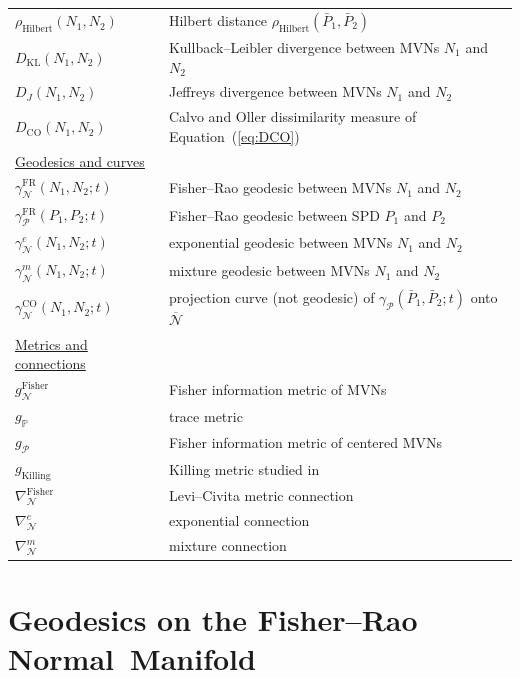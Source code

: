 \documentclass[entropy,article,accept,oneauthor,pdftex,entropy]{Definitions/mdpi}
\def\Hilbert{\mathrm{Hilbert}}
\def\bbP{\mathbb{P}}
\def\FR{\mathrm{FR}}
\def\barN{{\overline{\mathcal{N}}}}
\def\CO{\mathrm{CO}}
\def\KL{\mathrm{KL}}
\def\Killing{\mathrm{Killing}}
\def\Fisher{\mathrm{Fisher}}
\def\calN{\mathcal{N}}
\def\calP{\mathcal{P}}
\def\barP{{\bar P}}
\begin{document}
{\begin{tabular}{@{}p{4.1cm}l}
$\rho_\Hilbert(N_1,N_2)$ & Hilbert distance $\rho_\Hilbert(\barP_1,\barP_2)$\\
$D_\KL(N_1,N_2)$ & Kullback–Leibler divergence  between   MVNs $N_1$ and $N_2$\\
$D_J(N_1,N_2)$ & Jeffreys divergence  between   MVNs $N_1$ and $N_2$\\
$D_\CO(N_1,N_2)$ & Calvo and Oller dissimilarity measure of Equation~(\ref{eq:DCO})\\
%
\underline{Geodesics and curves} & \\
$\gamma_\calN^\FR(N_1,N_2;t)$ & Fisher–Rao geodesic between  MVNs $N_1$ and $N_2$\\
$\gamma_\calP^\FR(P_1,P_2;t)$ & Fisher–Rao geodesic between  SPD $P_1$ and $P_2$\\
$\gamma_\calN^e(N_1,N_2;t)$ & exponential geodesic between  MVNs $N_1$ and $N_2$\\
$\gamma_\calN^m(N_1,N_2;t)$ & mixture geodesic between MVNs $N_1$ and $N_2$\\
$\gamma_\calN^\CO(N_1,N_2;t)$ & projection curve (not geodesic) of $\gamma_\calP(\barP_1,\barP_2;t)$ onto $\barN$\\
%
\underline{Metrics and connections} & \\
$g_\calN^\Fisher$ & Fisher information metric of MVNs\\
$g_{\bbP}$ & trace metric \\
$g_{\calP}$ & Fisher information metric of centered MVNs\\
$g_\Killing$ & Killing metric studied in~\cite{lovric2000multivariate}\\
$\nabla_\calN^\Fisher$ & Levi–Civita metric connection\\
$\nabla_\calN^e$ & exponential connection\\
$\nabla_\calN^m$ & mixture connection
\end{tabular}}

\appendixstart
\appendix


\section{Geodesics on the Fisher--Rao Normal~Manifold}\label{sec:frgeo}
\end{document}

